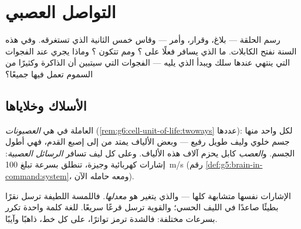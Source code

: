 \chapter{التواصل العصبي}\label{ch:g8:nervous-communication}

رسم  الحلقة --- بلاغ، وقرار،
وأمر --- وقاس خمس الثانية الذي تستغرقه. وفي هذه السنة
نفتح الكابلات. ما الذي يسافر فعلًا على ؟ ومم تتكون
؟ وماذا يجري عند الفجوات التي ينتهي عندها سلك
ويبدأ الذي يليه --- الفجوات التي سيتبين أن الذاكرة
وكثيرًا من السموم تعمل فيها جميعًا؟

\section{الأسلاك وخلاياها}

\begin{definition}\label{def:g8:nervous-communication:neuron}
 العاملة في  هي
\emph{العصبونات}
(\cref{rem:g6:cell-unit-of-life:twoways} عددها): لكل
واحد منها جسم خلوي وليف طويل رفيع --- وبعض الألياف يمتد
من  إلى إصبع القدم، فهي أطول  الجسم.
و\emph{العصب} كابل يحزم آلاف هذه الألياف.
وعلى كل ليف تسافر \emph{الرسائل
العصبية}: إشارات كهربائية وجيزة،
تنطلق بسرعة تبلغ \qty{100}{m/s}
(رقم \cref{def:g5:brain-in-command:system}، ومعه حامله
الآن).
\end{definition}

\begin{proposition}\label{prop:g8:nervous-communication:code}
الإشارات نفسها متشابهة كلها --- والذي يتغير هو
\emph{معدلها}. فاللمسة اللطيفة ترسل نقرًا بطيئًا صاعدًا
في الليف الحسي؛ والقوية ترسل قرعًا سريعًا. للغة  كلمة واحدة تكرر بسرعات مختلفة: فالشدة ترمز
تواترًا، على كل خط، ذاهبًا وآيبًا.
\end{proposition}
\admitted

